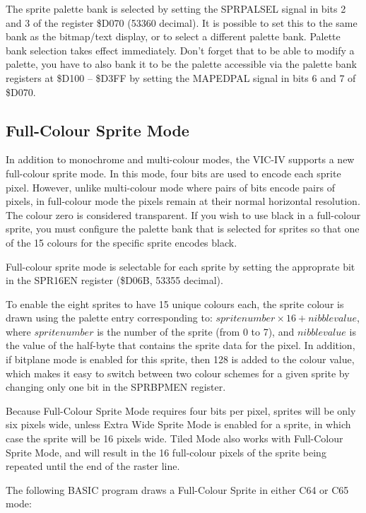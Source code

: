 The sprite palette bank is selected by setting the SPRPALSEL signal in bits 2 and 3 of the register \$D070 (53360 decimal).
It is possible to set this to the same bank as the bitmap/text display, or to select a different palette bank.
Palette bank selection takes effect immediately.  Don't forget that to be able to modify a palette, you have to also bank it
to be the palette accessible via the palette bank registers at \$D100 -- \$D3FF by setting the MAPEDPAL signal in bits 6 and 7 of
\$D070.

\subsection{Full-Colour Sprite Mode}

In addition to monochrome and multi-colour modes, the VIC-IV supports a new full-colour sprite mode.  In this mode, four bits are used to
encode each sprite pixel.  However, unlike multi-colour mode where pairs of bits encode pairs of pixels, in full-colour mode the pixels
remain at their normal horizontal resolution.  The colour zero is considered transparent. If you wish to use black in a full-colour sprite, you must configure the palette bank that is selected for sprites so that one of the 15 colours for the specific sprite encodes black.

Full-colour sprite mode is selectable for each sprite by setting the approprate bit in the SPR16EN register (\$D06B, 53355 decimal).

To enable the eight sprites to have 15 unique colours each, the sprite colour is drawn using the palette entry corresponding to:
$sprite number \times 16 + nibble value$, where $sprite number$ is the number of the sprite (from 0 to 7), and $nibble value$ is the value
of the half-byte that contains the sprite data for the pixel.  In addition, if bitplane mode is enabled for this sprite, then 128 is
added to the colour value, which makes it easy to switch between two colour schemes for a given sprite by changing only one bit in the
SPRBPMEN register.

Because Full-Colour Sprite Mode requires four bits per pixel, sprites will be only six pixels wide, unless Extra Wide Sprite Mode is enabled
for a sprite, in which case the sprite will be 16 pixels wide.  Tiled Mode also works with Full-Colour Sprite Mode, and will result in the
16 full-colour pixels of the sprite being repeated until the end of the raster line.

The following BASIC program draws a Full-Colour Sprite in either C64 or C65 mode:

